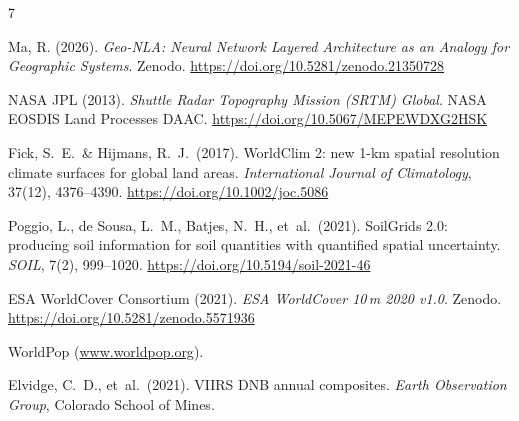 \documentclass[a4paper,11pt]{article}
\begin{document}
\begin{thebibliography}{7}

Ma, R. (2026).
\emph{Geo-NLA: Neural Network Layered Architecture as an Analogy for Geographic Systems}.
Zenodo.
\url{https://doi.org/10.5281/zenodo.21350728}

NASA JPL (2013).
\emph{Shuttle Radar Topography Mission (SRTM) Global}.
NASA EOSDIS Land Processes DAAC.
\url{https://doi.org/10.5067/MEPEWDXG2HSK}

Fick, S.\ E.\ \& Hijmans, R.\ J.\ (2017).
WorldClim 2: new 1-km spatial resolution climate surfaces for global land areas.
\emph{International Journal of Climatology}, 37(12), 4376--4390.
\url{https://doi.org/10.1002/joc.5086}

Poggio, L., de Sousa, L.\ M., Batjes, N.\ H., et~al.\ (2021).
SoilGrids 2.0: producing soil information for soil quantities with quantified spatial uncertainty.
\emph{SOIL}, 7(2), 999--1020.
\url{https://doi.org/10.5194/soil-2021-46}

ESA WorldCover Consortium (2021).
\emph{ESA WorldCover 10\,m 2020 v1.0}.
Zenodo.
\url{https://doi.org/10.5281/zenodo.5571936}

WorldPop (\url{www.worldpop.org}).

Elvidge, C.\ D., et~al.\ (2021).
VIIRS DNB annual composites.
\emph{Earth Observation Group}, Colorado School of Mines.

\end{thebibliography}
\end{document}
